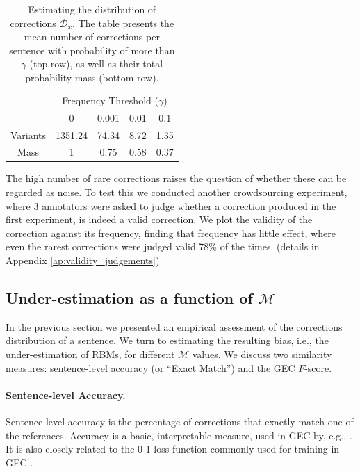 \documentclass[letterpaper, 11pt]{article}
\begin{document}
\begin{table}[h!]
	\vspace{-0.5cm}
  \centering
  \small
  \singlespacing
  \begin{tabular}{c|c|c|c|c|}
    & \multicolumn{4}{c|}{Frequency Threshold ($\gamma$)}\\ 
    & \multicolumn{1}{c}{0} & \multicolumn{1}{c}{0.001} & \multicolumn{1}{c}{0.01} & \multicolumn{1}{c|}{0.1}
    \\
    \hline
    Variants & 1351.24 & 74.34 & 8.72 & 1.35
    \\
    Mass & 1 & 0.75 & 0.58 & 0.37\\
    \hline
  \end{tabular}
  \caption{\label{tab:corrections_dist}
    Estimating the distribution of corrections $\mathcal{D}_x$.
    The table presents the mean number of corrections per sentence with probability of more than
    $\gamma$ (top row), as well as their total probability mass (bottom row).
  }
  \vspace{-0.3cm}
\end{table}

The high number of rare corrections raises the question of whether these can be regarded as noise.
To test this we conducted another crowdsourcing experiment, where 3 annotators were asked to judge whether a correction produced in the first experiment, is indeed a valid correction.
We plot the validity of the correction against its frequency, finding that frequency has little effect,
where even the rarest corrections were judged valid 78\% of the times.
(details in Appendix \ref{ap:validity_judgements})

\subsection{Under-estimation as a function of $\mathcal{M}$} \label{subsec:Assessment-values}
In the previous section we presented an empirical assessment of the corrections distribution of a sentence. We turn to estimating the resulting bias, i.e., the under-estimation of RBMs, for different $\mathcal{M}$ values. 
We discuss two similarity measures: sentence-level accuracy
(or ``Exact Match'') and the GEC $F$-score.

\paragraph{Sentence-level Accuracy.}
Sentence-level accuracy is the percentage of corrections that
exactly match one of the references.
Accuracy is a basic, interpretable measure, used in GEC by, e.g., .
It is also closely related to the 0-1 loss function commonly used
for training in GEC \cite{chodorow2012problems,rozovskaya2013joint}. 
\end{document}

